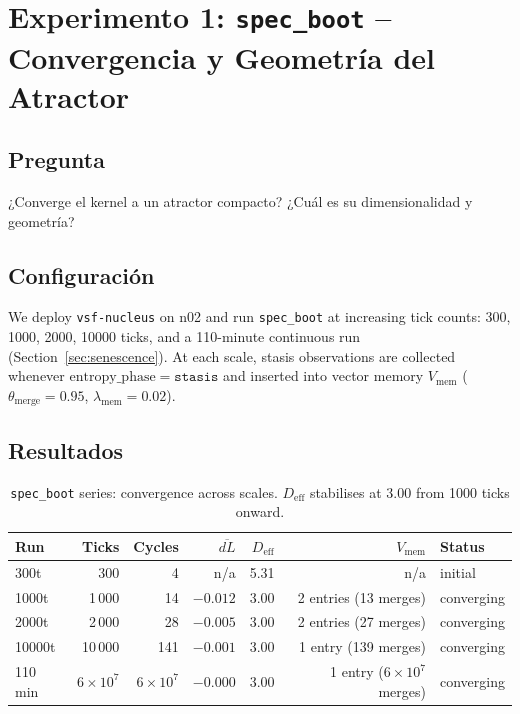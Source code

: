 \documentclass[11pt, a4paper]{article}
\newcommand{\nucleus}{\texttt{vsf-nucleus}}
\begin{document}
\section{Experimento 1: \texttt{spec\_boot} -- Convergencia y Geometría del Atractor}
\label{sec:specboot}

\subsection*{Pregunta} ¿Converge el kernel a un atractor compacto?
¿Cuál es su dimensionalidad y geometría?

\subsection{Configuración}

We deploy \nucleus{} on n02 and run \texttt{spec\_boot} at increasing tick
counts: 300, 1000, 2000, 10000 ticks, and a 110-minute continuous run
(Section~\ref{sec:senescence}).
At each scale, stasis observations are collected whenever
$\mathrm{entropy\_phase} = \texttt{stasis}$ and inserted into vector memory
$V_\text{mem}$ ($\theta_\text{merge} = 0.95$, $\lambda_\text{mem} = 0.02$).

\subsection{Resultados}

\begin{table}[h]
\centering
\begin{tabular}{lrrrrrl}
\toprule
Run & Ticks & Cycles & $\overline{dL}$ & $D_\text{eff}$ & $V_\text{mem}$ & Status \\
\midrule
300t   &    300 &   4 &  n/a     & 5.31 & n/a & initial \\
1000t  &  1\,000 &  14 & $-0.012$ & 3.00 & 2 entries (13 merges) & converging \\
2000t  &  2\,000 &  28 & $-0.005$ & 3.00 & 2 entries (27 merges) & converging \\
10000t & 10\,000 & 141 & $-0.001$ & 3.00 & 1 entry (139 merges)  & converging \\
110 min & $6{\times}10^7$ & $6{\times}10^7$ & $-0.000$ & 3.00 & 1 entry ($6{\times}10^7$ merges) & converging \\
\bottomrule
\end{tabular}
\caption{\texttt{spec\_boot} series: convergence across scales.
$D_\text{eff}$ stabilises at $3.00$ from 1000 ticks onward.}
\label{tab:specboot}
\end{table}
\end{document}

